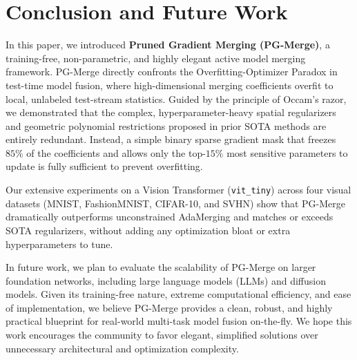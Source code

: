 \section{Conclusion and Future Work}
\label{sec:conclusion}

In this paper, we introduced \textbf{Pruned Gradient Merging (PG-Merge)}, a training-free, non-parametric, and highly elegant active model merging framework. PG-Merge directly confronts the Overfitting-Optimizer Paradox in test-time model fusion, where high-dimensional merging coefficients overfit to local, unlabeled test-stream statistics. Guided by the principle of Occam's razor, we demonstrated that the complex, hyperparameter-heavy spatial regularizers and geometric polynomial restrictions proposed in prior SOTA methods are entirely redundant. Instead, a simple binary sparse gradient mask that freezes $85\%$ of the coefficients and allows only the top-$15\%$ most sensitive parameters to update is fully sufficient to prevent overfitting.

Our extensive experiments on a Vision Transformer (\texttt{vit\_tiny}) across four visual datasets (MNIST, FashionMNIST, CIFAR-10, and SVHN) show that PG-Merge dramatically outperforms unconstrained AdaMerging and matches or exceeds SOTA regularizers, without adding any optimization bloat or extra hyperparameters to tune. 

In future work, we plan to evaluate the scalability of PG-Merge on larger foundation networks, including large language models (LLMs) and diffusion models. Given its training-free nature, extreme computational efficiency, and ease of implementation, we believe PG-Merge provides a clean, robust, and highly practical blueprint for real-world multi-task model fusion on-the-fly. We hope this work encourages the community to favor elegant, simplified solutions over unnecessary architectural and optimization complexity.